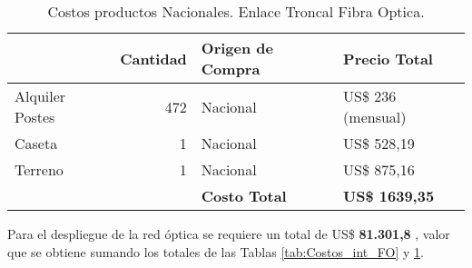 \begin{table}[H]
  \centering
    \begin{tabular}{|r|r|l|l|}
    \hline
    \rowcolor[HTML]{C5D9F1} \multicolumn{1}{|l|}{\textbf{Descripción}} & \multicolumn{1}{l|}{\textbf{Cantidad}} & \textbf{Origen de Compra} & \textbf{Precio Total} \bigstrut\\
    \hline
    \multicolumn{1}{|l|}{Alquiler Postes} & 472   & Nacional & US\$ 236 (mensual) \bigstrut\\
    \hline
    \multicolumn{1}{|l|}{Caseta} & 1     & Nacional & US\$ 528,19 \bigstrut\\
    \hline
    \multicolumn{1}{|l|}{Terreno} & 1     & Nacional & US\$ 875,16 \bigstrut\\
    \hline
    \rowcolor[HTML]{C5D9F1}       &       & \textbf{Costo Total} & \textbf{US\$ 1639,35} \bigstrut\\
    \hline
    \end{tabular}%
\caption{Costos productos Nacionales. Enlace Troncal Fibra Optica.}
  \label{tab:Costos_nac_FO}%
\end{table}%



Para el despliegue de la red óptica se requiere un total de  US\$ \textbf{81.301,8} , valor que se obtiene sumando los totales de las Tablas \ref{tab:Costos_int_FO} y \ref{tab:Costos_nac_FO}.



\newpage






